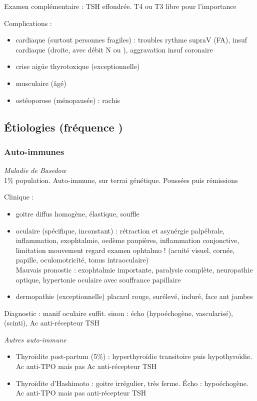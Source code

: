 \documentclass[11pt]{article}
\begin{document}
Examen complémentaire : TSH effondrée. T4 ou T3 libre pour l'importance

Complications : 
\begin{itemize}
\item cardiaque (surtout personnes fragiles) : troubles rythme supraV (FA), insuf
cardiaque (droite, avec débit N ou \inc), aggravation insuf coronaire
\item crise aigüe thyrotoxique (exceptionnelle)
\item musculaire (âgé)
\item ostéoporose (\female ménopausée) : rachis
\end{itemize}

\subsection{Étiologies (fréquence \dec)}
\label{sec:org6489b66}
\subsubsection{Auto-immunes}
\label{sec:org484976f}
\emph{Maladie de Basedow}\\
1\% population. Auto-immune, sur terrai génétique. Poussées puis rémissions

Clinique : 
\begin{itemize}
\item goitre diffus homogène, élastique, souffle
\item oculaire (spécifique, inconstant) : rétraction et asynérgie palpébrale,
inflammation, exophtalmie, oedème paupières, inflammation conjonctive,
limitation mouvement regard
\thus examen ophtalmo ! (acuité visuel, cornée, papille, oculomotricité, tonus
intraoculaire)\\
Mauvais pronostic : exophtalmie importante, paralysie complète, neuropathie
optique, hypertonie oculaire avec souffrance papillaire
\item dermopathie (exceptionnelle) placard rouge, surélevé, induré, face ant jambes
\end{itemize}

Diagnostic : manif oculaire suffit. sinon : écho (hypoéchogène, vascularisé),
(scinti), Ac anti-récepteur TSH

\emph{Autres auto-immune}\\
\begin{itemize}
\item Thyroïdite post-partum (5\%) : hyperthyroïdie transitoire puis hypothyroïdie. Ac
anti-TPO mais pas Ac anti-récepteur TSH
\item Thyroïdite d'Hashimoto : goitre irrégulier, très ferme. Écho :
hypoéchogène. Ac anti-TPO mais pas anti-récepteur TSH
\end{itemize}
\end{document}
